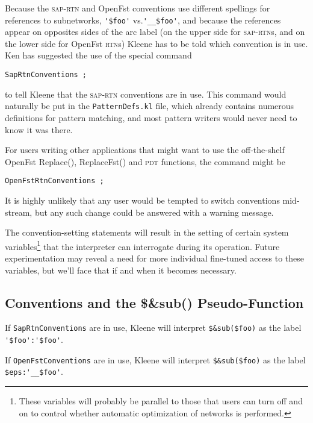 \documentclass[letterpaper,12pt]{article}
\providecommand{\acro}{}\renewcommand{\acro}{\textsc}
\begin{document}
Because the \acro{sap-rtn} and OpenFst conventions use different spellings for
references to subnetworks, \verb!'$foo'! vs.\@ \verb!'__$foo'!, and because the references
appear on opposites sides of the arc label (on the upper side for \acro{sap-rtn}s, and on
the lower side for OpenFst \acro{rtn}s) Kleene has to be told
which convention is in use.  Ken has suggested the use of the special command

\begin{Verbatim}[fontsize=\small]
SapRtnConventions ;
\end{Verbatim}

\noindent
to tell Kleene that the \acro{sap-rtn} conventions are in use.  This command would
naturally be put in the \texttt{PatternDefs.kl} file, which already contains numerous
definitions for pattern matching, and most pattern writers would never need to know
it was there.

For users writing other applications that might want to use the off-the-shelf OpenFst Replace(),
ReplaceFst() and \acro{pdt} functions, the command might be

\begin{Verbatim}[fontsize=\small]
OpenFstRtnConventions ;
\end{Verbatim}

It is highly unlikely that any user would be tempted to switch conventions mid-stream, but
any such change could be answered with a warning message.

The convention-setting statements will result in the setting of certain
system variables\footnote{These variables will probably be parallel to
those that users can turn off and on to control whether automatic
optimization of networks is performed.} that the interpreter can
interrogate during its operation.  Future experimentation may reveal a
need for more individual fine-tuned access to these variables, but we'll
face that if and when it becomes necessary.

\subsection{Conventions and the \$\&sub() Pseudo-Function}

If \texttt{SapRtnConventions} are in use, Kleene will interpret \verb!$&sub($foo)!
as the label \verb!'$foo':'$foo'!.


If \texttt{OpenFstConventions} are in use, Kleene will interpret \verb!$&sub($foo)!
as the label \verb!$eps:'__$foo'!.
\end{document}
